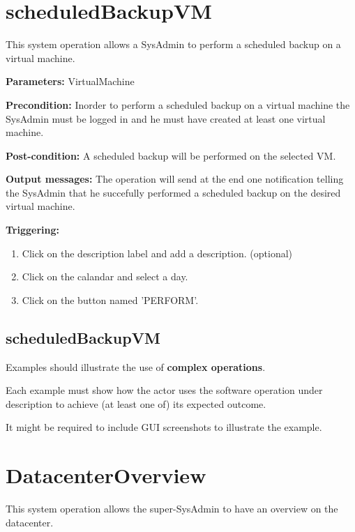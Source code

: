 \section{scheduledBackupVM}
\label{operation:scheduledBackupVM}
This system operation allows a SysAdmin to perform a scheduled backup on a
virtual machine.
\begin{description}

\item \textbf{Parameters:} VirtualMachine
\item \textbf{Precondition:} Inorder to perform a scheduled backup on a virtual
machine the SysAdmin must be logged in and he must have created at least one
virtual machine.
\item \textbf{Post-condition:} A scheduled backup will be performed on the
selected VM.
\item \textbf{Output messages:} The operation will send at the end one
notification telling the SysAdmin that he succefully performed a scheduled
backup on the desired virtual machine.

\item \textbf{Triggering:}
\begin{enumerate}
\item Click on the description label and add a description. (optional)
\item Click on the calandar and select a day.
\item Click on the button named 'PERFORM'.
\end{enumerate}

 
\end{description}

 
\subsection{scheduledBackupVM}
Examples should illustrate the use of \textbf{complex operations}.

Each example must show how the actor uses the software operation under
description to achieve (at least one of) its expected outcome.

It might be required to include GUI screenshots to illustrate the example.






\section{DatacenterOverview}
\label{operation:datacenteroverview}
This system operation allows the super-SysAdmin to have an overview on the
datacenter.

